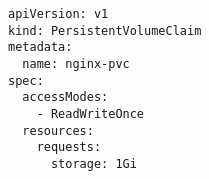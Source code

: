 \begin{verbatim}
apiVersion: v1
kind: PersistentVolumeClaim
metadata:
  name: nginx-pvc
spec:
  accessModes:
    - ReadWriteOnce
  resources:
    requests:
      storage: 1Gi
\end{verbatim}